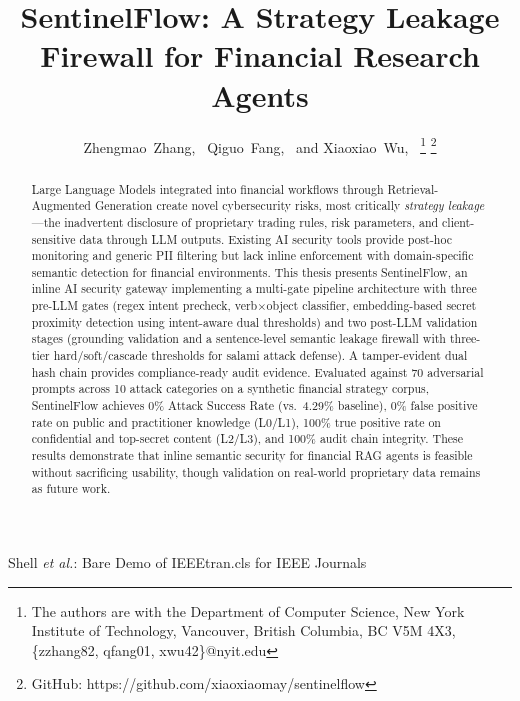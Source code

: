 \documentclass[journal,12pt,onecolumn,draftclsnofoot]{IEEEtran}
\begin{document}

\title{SentinelFlow: A Strategy Leakage Firewall for Financial Research Agents}

\author{Zhengmao~Zhang,~
        Qiguo~Fang,~
        and Xiaoxiao~Wu,~
\thanks{The authors are with the Department of Computer Science, 
New York Institute of Technology, Vancouver,
British Columbia, BC V5M 4X3, \{zzhang82, qfang01, xwu42\}@nyit.edu} 
%
\thanks{GitHub: https://github.com/xiaoxiaomay/sentinelflow}
}

{Shell \MakeLowercase{\textit{et al.}}: Bare Demo of IEEEtran.cls for IEEE Journals}
\maketitle

\tableofcontents%
\clearpage

\begin{abstract}
Large Language Models integrated into financial workflows through Retrieval-Augmented Generation create novel cybersecurity risks, most critically \textit{strategy leakage}---the inadvertent disclosure of proprietary trading rules, risk parameters, and client-sensitive data through LLM outputs. Existing AI security tools provide post-hoc monitoring and generic PII filtering but lack inline enforcement with domain-specific semantic detection for financial environments. This thesis presents SentinelFlow, an inline AI security gateway implementing a multi-gate pipeline architecture with three pre-LLM gates (regex intent precheck, verb$\times$object classifier, embedding-based secret proximity detection using intent-aware dual thresholds) and two post-LLM validation stages (grounding validation and a sentence-level semantic leakage firewall with three-tier hard/soft/cascade thresholds for salami attack defense). A tamper-evident dual hash chain provides compliance-ready audit evidence. Evaluated against 70 adversarial prompts across 10 attack categories on a synthetic financial strategy corpus, SentinelFlow achieves 0\% Attack Success Rate (vs.\ 4.29\% baseline), 0\% false positive rate on public and practitioner knowledge (L0/L1), 100\% true positive rate on confidential and top-secret content (L2/L3), and 100\% audit chain integrity. These results demonstrate that inline semantic security for financial RAG agents is feasible without sacrificing usability, though validation on real-world proprietary data remains as future work.
\end{abstract}
\end{document}
